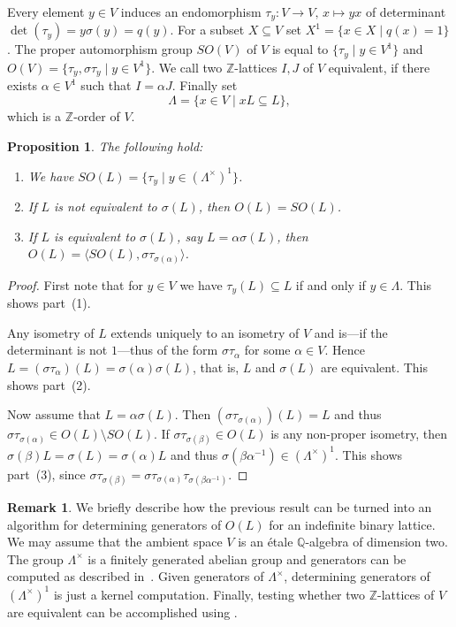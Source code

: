 \documentclass[a4paper]{amsart}
\theoremstyle{definition}
\newtheorem{remark}[definition]{Remark}
\theoremstyle{plain}
\newtheorem{proposition}[definition]{Proposition}
\newcommand{\QQ}{\mathbb{Q}}
\newcommand{\ZZ}{\mathbb{Z}}
\begin{document}
Every element $y \in V$ induces an endomorphism $\tau_y \colon V \to V, \, x \mapsto yx$ of determinant $\det(\tau_y) = y \sigma(y) = q(y)$.
For a subset $X \subseteq V$ set $X^1 = \{ x \in X \mid q(x) = 1 \}$.
The proper automorphism group $SO(V)$ of $V$ is equal to $\{ \tau_y \mid y \in V^1\}$
and $O(V) = \{ \tau_y, \sigma \tau_y \mid y \in V^1 \}$.
We call two $\ZZ$-lattices $I, J$ of $V$ equivalent, if there exists $\alpha \in V^1$ such that $I = \alpha J$.
Finally set
\[
  \Lambda = \{ x \in V \mid xL \subseteq L \},
\]
which is a $\ZZ$-order of $V$.

\begin{proposition}
  The following hold:
  \begin{enumerate}
    \item
      We have $SO(L) = \{ \tau_y \mid y \in (\Lambda^\times)^1 \}$.
    \item
      If $L$ is not equivalent to $\sigma(L)$, then $O(L) = SO(L)$.
    \item
      If $L$ is equivalent to $\sigma(L)$, say $L = \alpha \sigma(L)$, then
      $O(L) = \langle SO(L), \sigma \tau_{\sigma(\alpha)} \rangle$.
  \end{enumerate}
\end{proposition}

\begin{proof}
  First note that for $y \in V$ we have $\tau_y(L) \subseteq L$ if and only if $y \in \Lambda$.
  This shows part~(1).

  Any isometry of $L$ extends uniquely to an isometry of $V$ and is---if the determinant is not $1$---thus of the form $\sigma \tau_\alpha$ for some $\alpha \in V$.
  Hence $L = (\sigma \tau_\alpha)(L) = \sigma(\alpha) \sigma(L)$, that is, $L$ and $\sigma(L)$ are equivalent.
  This shows part~(2).

  Now assume that $L = \alpha \sigma(L)$.
  Then $(\sigma \tau_{\sigma(\alpha)})(L) = L$ and thus $\sigma \tau_{\sigma(\alpha)} \in O(L) \setminus SO(L)$.
  If $\sigma \tau_{\sigma(\beta)} \in O(L)$ is any non-proper isometry, then $\sigma(\beta) L = \sigma(L) = \sigma(\alpha) L$ and thus $\sigma(\beta \alpha^{-1}) \in (\Lambda^\times)^1$.
  This shows part~(3), since $\sigma \tau_{\sigma(\beta)} = \sigma \tau_{\sigma(\alpha)}\tau_{\sigma(\beta \alpha^{-1})}$.
\end{proof}
%
\begin{remark}
  We briefly describe how the previous result can be turned into an algorithm for determining generators of $O(L)$ for an indefinite binary lattice.
  We may assume that the ambient space $V$ is an étale $\QQ$-algebra of dimension two.
  The group $\Lambda^\times$ is a finitely generated abelian group and generators
  can be computed as described in~\cite{Bley2005, Kluners2005}.
  Given generators of $\Lambda^\times$, determining generators of $(\Lambda^\times)^1$ is just a kernel computation.
  Finally, testing whether two $\ZZ$-lattices of $V$ are equivalent can be accomplished using \cite{Bley2005, Marseglia2020}.
\end{remark}
\end{document}
